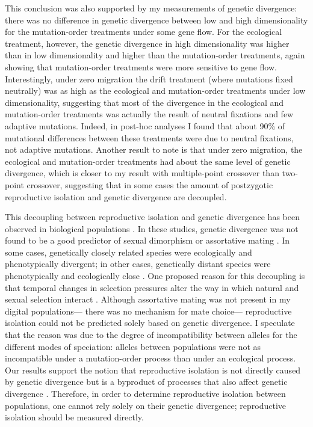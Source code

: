 \begin{doublespace}
This conclusion was also supported by my measurements of genetic divergence:
there was no difference in genetic divergence between low and high
dimensionality for the mutation-order treatments under some gene flow.
%
For the ecological treatment, however, the genetic divergence in high
dimensionality was higher than in low dimensionality and higher than the
mutation-order treatments, again showing that mutation-order treatments were
more sensitive to gene flow.
%
Interestingly, under zero migration the drift treatment (where mutations fixed
neutrally) was as high as the ecological and mutation-order treatments under
low dimensionality, suggesting that most of the divergence in the ecological
and mutation-order treatments was actually the result of neutral fixations and
few adaptive mutations.
%
Indeed, in post-hoc analyses I found that about 90\% of mutational differences
between these treatments were due to neutral fixations, not adaptive mutations.
%
Another result to note is that under zero migration, the ecological and
mutation-order treatments had about the same level of genetic divergence, which
is closer to my result with multiple-point crossover than two-point crossover,
suggesting that in some cases the amount of postzygotic reproductive isolation
and genetic divergence are decoupled.



This decoupling between reproductive isolation and genetic divergence
has been observed in biological populations \citep{ste09,mac12}.
%
In these studies, genetic divergence was not found to be a good predictor
of sexual dimorphism or assortative mating \citep{ste09,mac12}.
%
In some cases, genetically closely related species
were ecologically and phenotypically divergent;
in other cases, genetically distant species
were phenotypically and ecologically close \citep{ste09}.
%
One proposed reason for this decoupling
is that temporal changes in selection pressures
alter the way in which natural and sexual selection interact \citep{mac12}.
%
Although assortative mating was not present in my digital populations---%
there was no mechanism for mate choice---%
reproductive isolation could not be predicted
solely based on genetic divergence.
%
I speculate that the reason was due to the degree of incompatibility
between alleles for the different modes of speciation:
alleles between populations were not as incompatible
under a mutation-order process than under an ecological process.
%
Our results support the notion that reproductive isolation
is not directly caused by genetic divergence but is a byproduct
of processes that also affect genetic divergence \citep{per11}.
%
Therefore, in order to determine reproductive isolation between populations,
one cannot rely solely on their genetic divergence;
reproductive isolation should be measured directly.




\end{doublespace}
